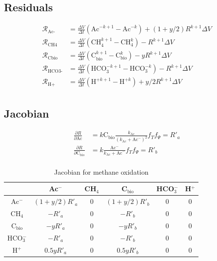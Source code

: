 \documentclass[12pt, a4paper]{article}
\begin{document}
\subsection{Residuals}
\begin{align*}
\mathcal{R}_{\text{Ac-}} & = \frac{\Delta V}{\Delta t} \left(\text{Ac}^{-k+1} - \text{Ac}^{-k}\right)  + (1+y/2) R^{k+1} \Delta V \\
\mathcal{R}_\text{CH4} & = \frac{\Delta V}{\Delta t} \left(\text{CH}_4^{k+1} - \text{CH}_4^k\right)  - R^{k+1} \Delta V \\
\mathcal{R}_\text{Cbio} & = \frac{\Delta V}{\Delta t} \left(\text{C}_\text{bio}^{k+1} - \text{C}_\text{bio}^k\right)  - y R^{k+1} \Delta V \\
\mathcal{R}_\text{HCO3-} & = \frac{\Delta V}{\Delta t} \left(\text{HCO}_3^{-k+1} - \text{HCO}_3^{-k}\right)  - R^{k+1} \Delta V \\
\mathcal{R}_\text{H+} & = \frac{\Delta V}{\Delta t} \left(\text{H}^{+k+1} - \text{H}^{+k}\right)  + y/2 R^{k+1} \Delta V \\
\end{align*}

\subsection{Jacobian}

\begin{align*}
\frac{\partial R}{\partial \text{Ac}} &= k \text{C}_\text{bio} \frac{k_\text{Ac}}{(k_\text{Ac} + \text{Ac}^-)^2}  f_T f_\Psi = R'_a \\
\frac{\partial R}{\partial \text{C}_\text{bio}} &= k \frac{\text{Ac}^-}{k_\text{Ac} + \text{Ac}^-}  f_T f_\Psi = R'_b\\
\end{align*}

\begin{table}[hb]
\centering
 \caption{Jacobian for methane oxidation} 
\begin{tabular}{ c | ccccc }
                      &  Ac$^-$ & CH$_4$  & C$_\text{bio}$ &  HCO$_3^-$  & H$^+$\\
  \hline 
  Ac$^-$              &$(1+y/2)R'_a$  & 0 & $(1+y/2)R'_b$   & 0 &0\\
  CH$_4$           &$-R'_a$          & 0 & $-R'_b$  &0 &0\\
  C$_\text{bio}$ &$-yR'_a$       &  0 &$-yR'_b$ &0 &0\\
  HCO$_3^-$     &$-R'_a$         &  0 &$-R'_b$     &0 &0\\
  H$^+$               &$0.5yR'_a$  &  0 &$0.5yR'_b$     &0 &0
\end{tabular}
\end{table}
\end{document}
